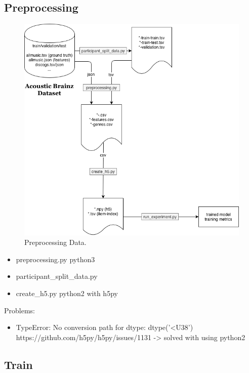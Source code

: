 \documentclass[sigconf,nonacm]{acmart}
\begin{document}
\subsection{Preprocessing}
  \begin{figure}
    \includegraphics[width=\linewidth]{Preprocess-Data.png}
    \caption{Preprocessing Data.}
    \label{fig:preprocess}
  \end{figure}

  \begin{itemize}
    \item preprocessing.py python3
    \item participant\_split\_data.py
    \item create\_h5.py python2 with h5py
  \end{itemize}

  Problems:
  \begin{itemize}
    \item TypeError: No conversion path for dtype: dtype('<U38') https://github.com/h5py/h5py/issues/1131 -> solved with using python2
  \end{itemize}

\subsection{Train}
\end{document}
